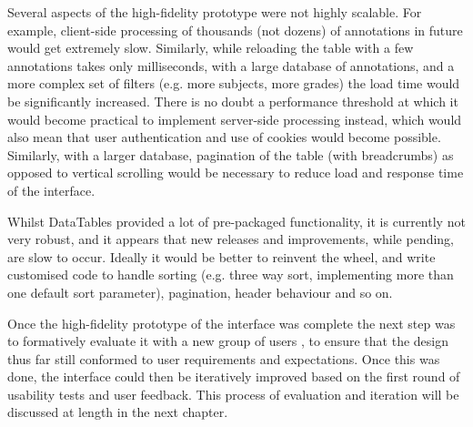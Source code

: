 Several aspects of the high-fidelity prototype were not highly scalable. For example, client-side processing of thousands (not dozens) of annotations in future would get extremely slow. Similarly, while reloading the table with a few annotations takes only milliseconds, with a large database of annotations, and a more complex set of filters (e.g. more subjects, more grades) the load time would be significantly increased. There is no doubt a performance threshold at which it would become practical to implement server-side processing instead, which would also mean that user authentication and use of cookies would become possible. Similarly, with a larger database, pagination of the table (with breadcrumbs) as opposed to vertical scrolling would be necessary to reduce load and response time of the interface. 

Whilst DataTables provided a lot of pre-packaged functionality, it is currently not very robust, and it appears that new releases and improvements, while pending, are slow to occur. Ideally it would be better to reinvent the wheel, and write customised code to handle sorting (e.g. three way sort, implementing more than one default sort parameter), pagination, header behaviour and so on. 

Once the high-fidelity prototype of the interface was complete the next step was to formatively evaluate it with a new group of users \citep[p. 329]{RogersPreece}, to ensure that the design thus far still conformed to user requirements and expectations. Once this was done, the interface could then be iteratively improved based on the first round of usability tests and user feedback. This process of evaluation and iteration will be discussed at length in the next chapter. 
